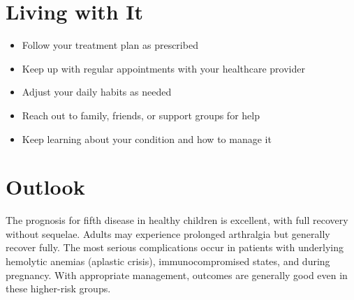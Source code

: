 \section{Living with It}

\begin{itemize}[noitemsep]
  \item Follow your treatment plan as prescribed
  \item Keep up with regular appointments with your healthcare provider
  \item Adjust your daily habits as needed
  \item Reach out to family, friends, or support groups for help
  \item Keep learning about your condition and how to manage it
\end{itemize}

\section{Outlook}
The prognosis for fifth disease in healthy children is excellent, with full recovery without sequelae. Adults may experience prolonged arthralgia but generally recover fully. The most serious complications occur in patients with underlying hemolytic anemias (aplastic crisis), immunocompromised states, and during pregnancy. With appropriate management, outcomes are generally good even in these higher-risk groups.
